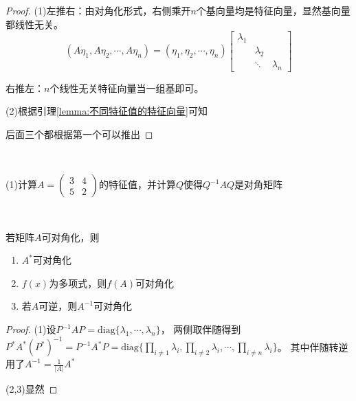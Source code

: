 \begin{proof}
  (1)左推右：由对角化形式，右侧乘开$n$个基向量均是特征向量，显然基向量都线性无关。
  \begin{equation*}
    \left(A \eta_{1}, A \eta_{2}, \cdots, A \eta_{n}\right)=\left(\eta_{1}, \eta_{2}, \cdots, \eta_{n}\right)\left[\begin{array}{lll}
                                                                                                                     \lambda_{1} & & \\
                                                                                                                                 & \lambda_{2} & \\
                                                                                                                                 & \ddots & \lambda_{n}
                                                                                                                   \end{array}\right]
  \end{equation*}

  右推左：$n$个线性无关特征向量当一组基即可。

  (2)根据引理\ref{lemma:不同特征值的特征向量}可知

  后面三个都根据第一个可以推出
\end{proof}

~

\begin{exercise}[对角化计算]
  (1)计算$A = \left(
    \begin{array}{cc}
      3&4\\
      5&2
    \end{array}
  \right)$的特征值，并计算$Q$使得$Q^{-1}AQ$是对角矩阵
\end{exercise}



~

\begin{theorem}[相关矩阵的可对角化性质]
  若矩阵$A$可对角化，则
  \begin{enumerate}
  \item $A^{\ast}$可对角化
  \item $f(x)$为多项式，则$f(A)$可对角化
  \item 若$A$可逆，则$A^{-1}$可对角化
  \end{enumerate}
\end{theorem}

\begin{proof}
  (1)设$P^{-1}AP = \mathrm{diag}\{\lambda_1,\cdots,\lambda_n\}$，
  两侧取伴随得到$P^{\ast}A^{\ast}(P^{\ast})^{-1} = P^{-1}A^{\ast}P = \mathrm{diag}\{\prod \limits_{i \neq 1} \lambda_i, \prod \limits_{i \neq 2}\lambda_i, \cdots, \prod \limits_{i \neq n}\lambda_i\}$。
  其中伴随转逆用了$A^{-1} = \frac{1}{|A|}A^{\ast}$

  (2,3)显然
\end{proof}






